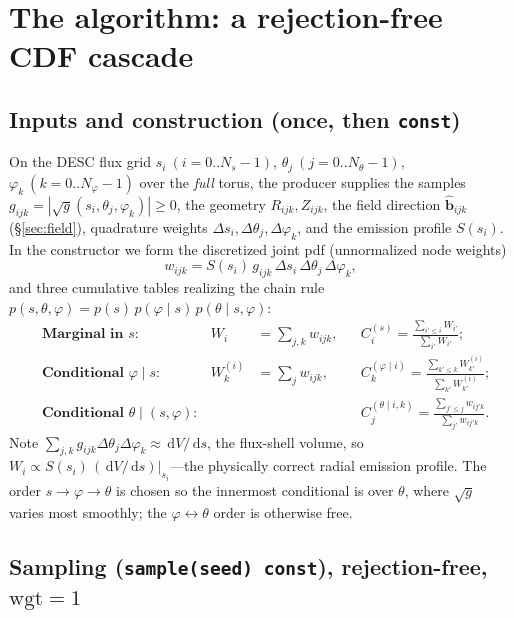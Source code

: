 \documentclass[11pt]{article}
\newcommand{\sg}{\sqrt{g}}
\newcommand{\bhat}{\hat{\mathbf{b}}}
\newcommand{\dd}{\,\mathrm{d}}
\newcommand{\code}[1]{\texttt{#1}}
\begin{document}
\section{The algorithm: a rejection-free CDF cascade}
\label{sec:algorithm}

\subsection{Inputs and construction (once, then \code{const})}

On the DESC flux grid $s_i\ (i=0..N_s-1)$, $\theta_j\ (j=0..N_\theta-1)$,
$\varphi_k\ (k=0..N_\varphi-1)$ over the \emph{full} torus, the producer supplies the
samples $g_{ijk}=|\sg(s_i,\theta_j,\varphi_k)|\ge0$, the geometry $R_{ijk},Z_{ijk}$,
the field direction $\bhat_{ijk}$ (\S\ref{sec:field}), quadrature weights
$\Delta s_i,\Delta\theta_j,\Delta\varphi_k$, and the emission profile $S(s_i)$. In the
constructor we form the discretized joint pdf (unnormalized node weights)
\begin{equation}
w_{ijk}=S(s_i)\,g_{ijk}\,\Delta s_i\,\Delta\theta_j\,\Delta\varphi_k ,
\label{eq:wijk}
\end{equation}
and three cumulative tables realizing the chain rule
$p(s,\theta,\varphi)=p(s)\,p(\varphi\mid s)\,p(\theta\mid s,\varphi)$:
\begin{align}
&\textbf{Marginal in }s:& W_i&=\sum_{j,k}w_{ijk},&
&C^{(s)}_i=\frac{\sum_{i'\le i}W_{i'}}{\sum_{i'}W_{i'}} ;\\
&\textbf{Conditional }\varphi\mid s:& W^{(i)}_k&=\sum_{j}w_{ijk},&
&C^{(\varphi\mid i)}_k=\frac{\sum_{k'\le k}W^{(i)}_{k'}}{\sum_{k'}W^{(i)}_{k'}} ;\\
&\textbf{Conditional }\theta\mid(s,\varphi):& &&
&C^{(\theta\mid i,k)}_j=\frac{\sum_{j'\le j}w_{ij'k}}{\sum_{j'}w_{ij'k}} .
\end{align}
Note $\sum_{j,k} g_{ijk}\Delta\theta_j\Delta\varphi_k\approx \dd V/\dd s$, the
flux-shell volume, so $W_i\propto S(s_i)\,(\dd V/\dd s)|_{s_i}$---the physically
correct radial emission profile. The order $s\!\to\!\varphi\!\to\!\theta$ is chosen so
the innermost conditional is over $\theta$, where $\sg$ varies most smoothly; the
$\varphi\leftrightarrow\theta$ order is otherwise free.

\subsection{Sampling (\code{sample(seed) const}), rejection-free, $\mathrm{wgt}=1$}
\end{document}
